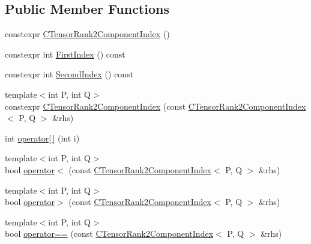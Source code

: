 \subsection*{Public Member Functions}
\begin{DoxyCompactItemize}
\item 
constexpr \mbox{\hyperlink{classmpc_1_1core_1_1_c_tensor_rank2_component_index_a46ac9bf492508d77742028988f69935e}{C\+Tensor\+Rank2\+Component\+Index}} ()
\item 
constexpr int \mbox{\hyperlink{classmpc_1_1core_1_1_c_tensor_rank2_component_index_a406715396e26cf9606979b8c34982271}{First\+Index}} () const
\item 
constexpr int \mbox{\hyperlink{classmpc_1_1core_1_1_c_tensor_rank2_component_index_a442ae55dfc043f4b1d2bca60575f871d}{Second\+Index}} () const
\item 
{\footnotesize template$<$int P, int Q$>$ }\\constexpr \mbox{\hyperlink{classmpc_1_1core_1_1_c_tensor_rank2_component_index_a46b24107de94dc221e9f6549f79f0fff}{C\+Tensor\+Rank2\+Component\+Index}} (const \mbox{\hyperlink{classmpc_1_1core_1_1_c_tensor_rank2_component_index}{C\+Tensor\+Rank2\+Component\+Index}}$<$ P, Q $>$ \&rhs)
\item 
int \mbox{\hyperlink{classmpc_1_1core_1_1_c_tensor_rank2_component_index_a3c99d933e4ae372fe73cd6afabf0570d}{operator\mbox{[}$\,$\mbox{]}}} (int i)
\item 
{\footnotesize template$<$int P, int Q$>$ }\\bool \mbox{\hyperlink{classmpc_1_1core_1_1_c_tensor_rank2_component_index_a376fbe0ee4fd0e934d5d06b5370e1b96}{operator$<$}} (const \mbox{\hyperlink{classmpc_1_1core_1_1_c_tensor_rank2_component_index}{C\+Tensor\+Rank2\+Component\+Index}}$<$ P, Q $>$ \&rhs)
\item 
{\footnotesize template$<$int P, int Q$>$ }\\bool \mbox{\hyperlink{classmpc_1_1core_1_1_c_tensor_rank2_component_index_a09ad8de90ca42234aa1b37ece4f6f989}{operator$>$}} (const \mbox{\hyperlink{classmpc_1_1core_1_1_c_tensor_rank2_component_index}{C\+Tensor\+Rank2\+Component\+Index}}$<$ P, Q $>$ \&rhs)
\item 
{\footnotesize template$<$int P, int Q$>$ }\\bool \mbox{\hyperlink{classmpc_1_1core_1_1_c_tensor_rank2_component_index_a3b672ed7feddcd26a97b5bdf8c951724}{operator==}} (const \mbox{\hyperlink{classmpc_1_1core_1_1_c_tensor_rank2_component_index}{C\+Tensor\+Rank2\+Component\+Index}}$<$ P, Q $>$ \&rhs)

\end{DoxyCompactItemize}
